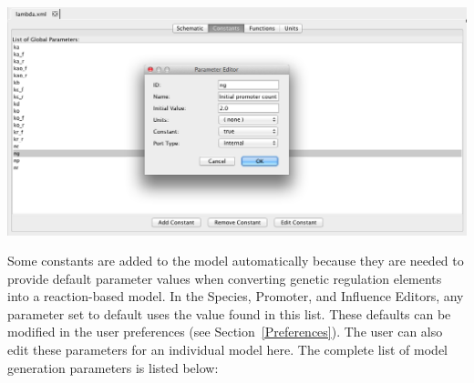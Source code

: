 \documentclass[titlepage,11pt]{article}
\begin{document}
\begin{center}
\includegraphics[width=160mm]{screenshots/GCMparam}
\end{center}

\noindent
Some constants are added to the model automatically because they are needed to provide default parameter values when converting genetic regulation elements into a reaction-based model.  
In the Species, Promoter, and Influence Editors, any parameter set to default uses the value found in this list.  These defaults can be modified in the user preferences (see Section~\ref{Preferences}).  The user can also edit these parameters for an individual model here.  
The complete list of model generation parameters is listed below:
\end{document}
